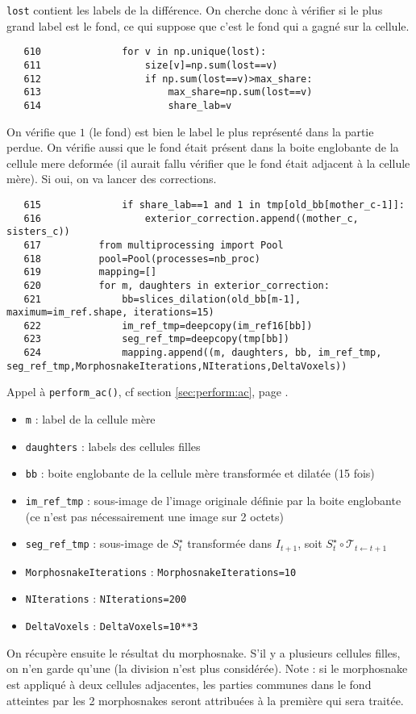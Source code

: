 \documentclass{article}
\def \mycolor {red}
\begin{document}
\color{\mycolor}
\verb|lost|  contient  les labels de la diff\'erence. On cherche donc \`a v\'erifier si le plus grand label est le fond, ce qui suppose que c'est le fond qui a gagn\'e sur la cellule.
\color{black}
\begin{verbatim}
   610	            for v in np.unique(lost):
   611	                size[v]=np.sum(lost==v)
   612	                if np.sum(lost==v)>max_share:
   613	                    max_share=np.sum(lost==v)
   614	                    share_lab=v
\end{verbatim} 
\color{\mycolor}
On v\'erifie que $1$ (le fond) est bien le label le plus repr\'esent\'e dans la partie perdue. On v\'erifie aussi que le fond \'etait pr\'esent dans la boite englobante de la cellule mere deform\'ee (il aurait fallu v\'erifier que le fond \'etait adjacent \`a la cellule m\`ere). Si oui, on va lancer des corrections.
\color{black}
\begin{verbatim}
   615	            if share_lab==1 and 1 in tmp[old_bb[mother_c-1]]:
   616	                exterior_correction.append((mother_c, sisters_c))
   617	        from multiprocessing import Pool
   618	        pool=Pool(processes=nb_proc)
   619	        mapping=[]
   620	        for m, daughters in exterior_correction:
   621	            bb=slices_dilation(old_bb[m-1], maximum=im_ref.shape, iterations=15)
   622	            im_ref_tmp=deepcopy(im_ref16[bb])
   623	            seg_ref_tmp=deepcopy(tmp[bb])
   624	            mapping.append((m, daughters, bb, im_ref_tmp, seg_ref_tmp,MorphosnakeIterations,NIterations,DeltaVoxels))
\end{verbatim} 
\color{\mycolor}
Appel \`a \texttt{perform\_ac()}, cf section \ref{sec:perform:ac}, page \pageref{sec:perform:ac}.
\begin{itemize}
\itemsep -1ex
\item \verb|m| : label de la cellule m\`ere 
\item \verb|daughters| : labels des cellules filles
\item \verb|bb| : boite englobante de la cellule m\`ere transform\'ee et dilat\'ee (15 fois)
\item \verb|im_ref_tmp| : sous-image de l'image originale d\'efinie par la boite englobante (ce n'est pas n\'ecessairement une image sur 2 octets)
\item \verb|seg_ref_tmp| : sous-image de $S^{\star}_t$ transform\'ee dans $I_{t+1}$, soit $S^{\star}_t \circ \mathcal{T}_{t \leftarrow t+1}$
\item \verb|MorphosnakeIterations| : \verb|MorphosnakeIterations=10|
\item \verb|NIterations| : \verb|NIterations=200|
\item \verb|DeltaVoxels| : \verb|DeltaVoxels=10**3|
\end{itemize}
On r\'ecup\`ere ensuite le r\'esultat du morphosnake. S'il y a plusieurs cellules filles, on n'en garde qu'une (la division n'est plus consid\'er\'ee). Note : si le morphosnake est appliqu\'e à deux cellules adjacentes, les parties communes dans le fond atteintes par les 2 morphosnakes seront attribu\'ees \`a la premi\`ere qui sera trait\'ee.
\end{document}
